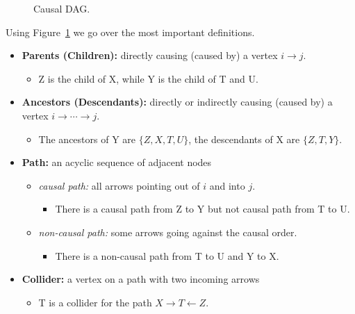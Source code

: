 \documentclass[11pt]{exam}
\begin{document}
\begin{figure}[h!]
\centering
{}
\caption{Causal DAG.}
\label{fig:causal_dag}
\end{figure}
Using Figure~\ref{fig:causal_dag} we go over the most important definitions.
\begin{itemize}[leftmargin=*, itemsep=0.25em] %
  \item \textbf{Parents (Children):} directly causing (caused by) a vertex \( i \to j \).
  \begin{itemize}
      \item Z is the child of X, while Y is the child of T and U.
  \end{itemize}
  \item \textbf{Ancestors (Descendants):} directly or indirectly causing (caused by) a vertex \( i \to \cdots \to j \).
  \begin{itemize}
      \item The ancestors of Y are $\{Z, X, T, U\}$, the descendants of X are $\{Z, T, Y\}$.
  \end{itemize}
  \item \textbf{Path:} an acyclic sequence of adjacent nodes
    \begin{itemize}[leftmargin=2em, itemsep=0.15em]
      \item \emph{causal path:} all arrows pointing out of \(i\) and into \(j\).
      \begin{itemize}
          \item There is a causal path from Z to Y but not causal path from T to U.
      \end{itemize}
      \item \emph{non-causal path:} some arrows going against the causal order.
      \begin{itemize}
          \item There is a non-causal path from T to U and Y to X.
      \end{itemize}
    \end{itemize}
    \item \textbf{Collider:} a vertex on a path with two incoming arrows
    \begin{itemize}
        \item T is a collider for the path $X \to T \leftarrow Z$.
    \end{itemize}
\end{itemize}
\end{document}
